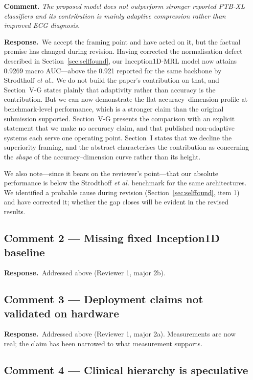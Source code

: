 \documentclass[11pt,a4paper]{article}
\newcommand{\comment}[1]{\par\medskip\noindent\textcolor{revblue}{\textbf{Comment.} \textit{#1}}\par\smallskip}
\newcommand{\response}{\par\noindent\textbf{Response.}\ }
\newcommand{\etal}{\textit{et al.}}
\begin{document}
\comment{The proposed model does not outperform stronger reported PTB-XL
classifiers and its contribution is mainly adaptive compression rather than
improved ECG diagnosis.}

\response We accept the framing point and have acted on it, but the factual
premise has changed during revision. Having corrected the normalisation defect
described in Section~\ref{sec:selffound}, our Inception1D-MRL model now
attains 0.9269 macro AUC---above the 0.921 reported for the same backbone by
Strodthoff \etal. We do not build the paper's contribution on that, and
Section~V-G states plainly that adaptivity rather than accuracy is the
contribution. But we can now demonstrate the flat accuracy--dimension profile
at benchmark-level performance, which is a stronger claim than the original
submission supported. Section~V-G presents the comparison with an
explicit statement that we make no accuracy claim, and that published
non-adaptive systems each serve one operating point. Section~I states that we
decline the superiority framing, and the abstract characterises the
contribution as concerning the \emph{shape} of the accuracy--dimension curve
rather than its height.

We also note---since it bears on the reviewer's point---that our absolute
performance is below the Strodthoff \etal{} benchmark for the same
architectures. We identified a probable cause during revision
(Section~\ref{sec:selffound}, item 1) and have corrected it; whether the gap
closes will be evident in the revised results.

\subsection*{Comment 2 --- Missing fixed Inception1D baseline}

\response Addressed above (Reviewer 1, major 2b).

\subsection*{Comment 3 --- Deployment claims not validated on hardware}

\response Addressed above (Reviewer 1, major 2a). Measurements are now real;
the claim has been narrowed to what measurement supports.

\subsection*{Comment 4 --- Clinical hierarchy is speculative}
\end{document}
